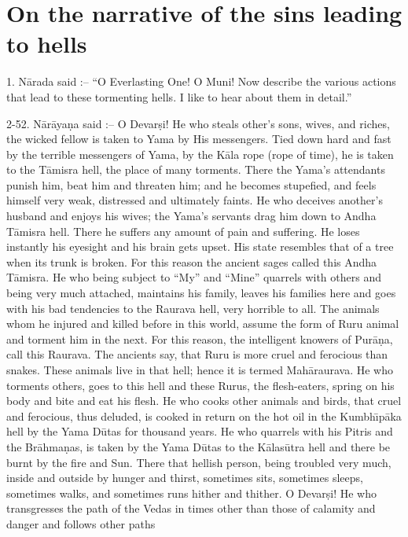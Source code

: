 \chapter{On the narrative of the sins leading to hells}

1. N\=arada said :-- ``O Everlasting One! O Muni! Now describe the various actions that lead to these tormenting hells. I like to hear about them in detail.''

2-52. N\=ar\=aya\d{n}a said :-- O Devar\d{s}i! He who steals other's sons, wives, and riches, the wicked fellow is taken to Yama by His messengers. Tied down hard and fast by the terrible messengers of Yama, by the K\=ala rope (rope of time), he is taken to the T\=amisra hell, the place of many torments. There the Yama's attendants punish him, beat him and threaten him; and he becomes stupefied, and feels himself very weak, distressed and ultimately faints. He who deceives another's husband and enjoys his wives; the Yama's servants drag him down to Andha T\=amisra hell. There he suffers any amount of pain and suffering. He loses instantly his eyesight and his brain gets upset. His state resembles that of a tree when its trunk is broken. For this reason the ancient sages called this Andha T\=amisra. He who being subject to ``My'' and ``Mine'' quarrels with others and being very much attached, maintains his family, leaves his families here and goes with his bad tendencies to the Raurava hell, very horrible to all. The animals whom he injured and killed before in this world, assume the form of Ruru animal and torment him in the next. For this reason, the intelligent knowers of Pur\=a\d{n}a, call this Raurava. The ancients say, that Ruru is more cruel and ferocious than snakes. These animals live in that hell; hence it is termed Mah\=araurava. He who torments others, goes to this hell and these Rurus, the flesh-eaters, spring on his body and bite and eat his flesh. He who cooks other animals and birds, that cruel and ferocious, thus deluded, is cooked in return on the hot oil in the Kumbh\={\i}p\=aka hell by the Yama D\=utas for thousand years. He who quarrels with his Pitris and the Br\=ahma\d{n}as, is taken by the Yama D\=utas to the K\=alas\=utra hell and there be burnt by the fire and Sun. There that hellish person, being troubled very much, inside and outside by hunger and thirst, sometimes sits, sometimes sleeps, sometimes walks, and sometimes runs hither and thither. O Devar\d{s}i! He who transgresses the path of the Vedas in times other than those of calamity and danger and follows other paths

